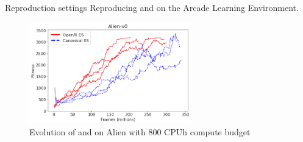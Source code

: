 \begin{frame}{\tcii{} \berl{}}

    \begin{block}{Reproduction settings}
        Reproducing \canonical{} \canonicalpaper{} and \openaies{} \openaipaper{} on the Arcade Learning Environment.
    \end{block}
    
    \begin{center}
        \begin{figure}
            \includegraphics[width=7cm]{images/BERL/Alien-v0.png}
            \caption{Evolution of \canonical{} and \openaies{} on Alien with 800 CPUh compute budget}
        \end{figure}
    \end{center}

\end{frame}